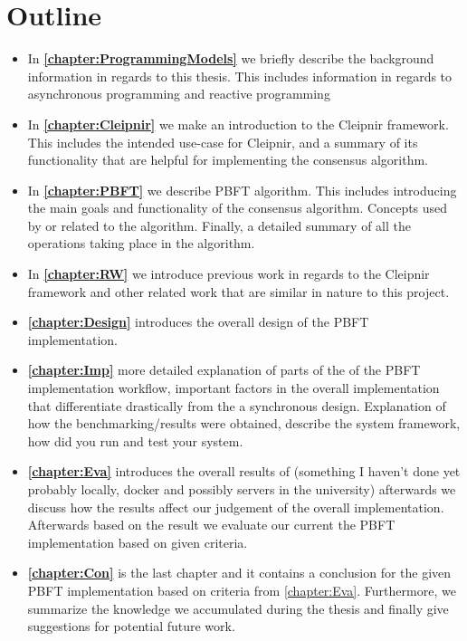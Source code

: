 \section{Outline}
\begin{itemize}
\item In \textbf{\autoref{chapter:ProgrammingModels}} we briefly describe the background information in regards to this thesis. This includes information in regards to asynchronous programming and reactive programming

\item In \textbf{\autoref{chapter:Cleipnir}} we make an introduction to the Cleipnir framework. This includes the intended use-case for Cleipnir, and a summary of its functionality that are helpful for implementing the consensus algorithm. 

\item In \textbf{\autoref{chapter:PBFT}} we describe PBFT algorithm. This includes introducing the main goals and functionality of the consensus algorithm. Concepts used by or related to the algorithm. Finally, a detailed summary of all the operations taking place in the algorithm.

\item In \textbf{\autoref{chapter:RW}} we introduce previous work in regards to the Cleipnir framework and other related work that are similar in nature to this project.

\item \textbf{\autoref{chapter:Design}} introduces the overall design of the PBFT implementation.

\item \textbf{\autoref{chapter:Imp}} more detailed explanation of parts of the of the PBFT implementation workflow, important factors in the overall implementation that differentiate drastically from the a synchronous design. Explanation of how the benchmarking/results were obtained, describe the system framework, how did you run and test your system.

\item \textbf{\autoref{chapter:Eva}} introduces the overall results of (something I haven't done yet probably locally, docker and possibly servers in the university) afterwards we discuss how the results affect our judgement of the overall implementation. Afterwards based on the result we evaluate our current the PBFT implementation based on given criteria.

\item \textbf{\autoref{chapter:Con}} is the last chapter and it contains a conclusion for the given PBFT implementation based on criteria from \autoref{chapter:Eva}. Furthermore, we summarize the knowledge we accumulated during the thesis and finally give suggestions for potential future work.
\end{itemize}